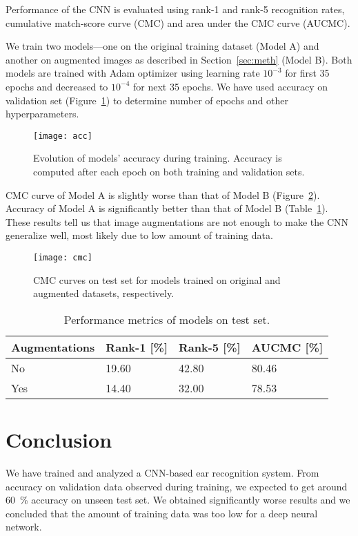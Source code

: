 \documentclass[9pt]{IEEEtran}
\begin{document}
Performance of the CNN is evaluated using rank-1 and rank-5 recognition rates, cumulative match-score curve (CMC) and area under the CMC curve (AUCMC).

We train two models---one on the original training dataset (Model A) and another on augmented images as described in Section~\ref{sec:meth} (Model B).
Both models are trained with Adam optimizer using learning rate $10^{-3}$ for first 35 epochs and decreased to $10^{-4}$ for next 35 epochs.
We have used accuracy on validation set (Figure~\ref{fig:acc}) to determine number of epochs and other hyperparameters.

\begin{figure}[ht]
    \centering
    \texttt{[image: acc]}
    \caption{Evolution of models' accuracy during training.
    Accuracy is computed after each epoch on both training and validation sets.}
    \label{fig:acc}
\end{figure}

CMC curve of Model A is slightly worse than that of Model B (Figure~\ref{fig:cmc}).
Accuracy of Model A is significantly better than that of Model B (Table~\ref{tab:metrics}).
These results tell us that image augmentations are not enough to make the CNN generalize well, most likely due to low amount of training data.

\begin{figure}[ht]
    \centering
    \texttt{[image: cmc]}
    \caption{CMC curves on test set for models trained on original and augmented datasets, respectively.}
    \label{fig:cmc}
\end{figure}

\begin{table}[ht]
    \caption{Performance metrics of models on test set.}
    \label{tab:metrics}
    \centering
    \begin{tabular}{llll}
        Augmentations & Rank-1 [\%] & Rank-5 [\%] & AUCMC [\%] \\
        \hline
        No & 19.60 & 42.80 & 80.46 \\
        Yes & 14.40 & 32.00 & 78.53
    \end{tabular}
\end{table}

\section{Conclusion}

We have trained and analyzed a CNN-based ear recognition system.
From accuracy on validation data observed during training, we expected to get around 60~\% accuracy on unseen test set.
We obtained significantly worse results and we concluded that the amount of training data was too low for a deep neural network.
\end{document}
